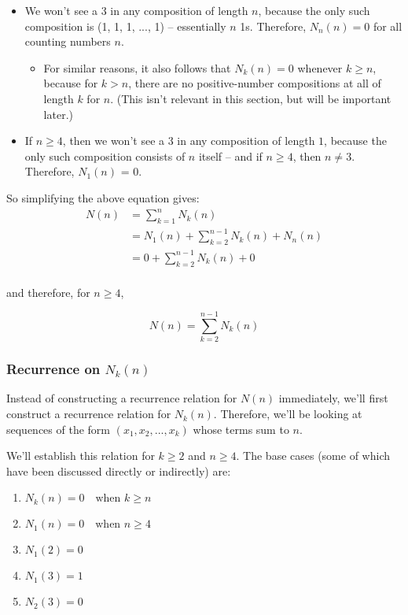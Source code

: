 \begin{itemize}
\item We won't see a 3 in any composition of length $n$, because the only such composition is (1, 1, 1, ..., 1) -- essentially $n$ 1s. Therefore, $N_n(n) = 0$ for all counting numbers $n$.
\begin{itemize}
\item For similar reasons, it also follows that $N_k(n) = 0$ whenever $k \geq n$, because for $k > n$, there are no positive-number compositions at all of length $k$ for $n$. (This isn't relevant in this section, but will be important later.)
\end{itemize}
\item If $n \geq 4$, then we won't see a 3 in any composition of length $1$, because the only such composition consists of $n$ itself -- and if $n \geq 4$, then $n \neq 3$. Therefore, $N_1(n)$ = 0. 
\end{itemize}

So simplifying the above equation gives:
\begin{align*}
N(n) &= \sum_{k=1}^{n} N_k(n) \\
&= N_1(n) + \sum_{k=2}^{n-1} N_k(n) + N_n(n) \\
&= 0 + \sum_{k=2}^{n-1} N_k(n) + 0 \\
\end{align*}

and therefore, for $n \geq 4$,

\begin{equation}
\label{composition-num-3s-n-nk}
N(n) = \sum_{k=2}^{n-1} N_k(n)
\end{equation}

\subsubsection{Recurrence on $N_k(n)$}

Instead of constructing a recurrence relation for $N(n)$ immediately, we'll first construct a recurrence relation for $N_k(n)$. Therefore, we'll be looking at sequences of the form $(x_1, x_2, ..., x_k)$ whose terms sum to $n$.

We'll establish this relation for $k \geq 2$ and $n \geq 4$. The base cases (some of which have been discussed directly or indirectly) are:

\begin{enumerate}
\item $N_k(n) = 0 \quad \text{when } k \geq n$ \label{eqbc-3s-1}
\item $N_1(n) = 0 \quad \text{when } n \geq 4$  \label{eqbc-3s-2}
\item $N_1(2) = 0$  \label{eqbc-3s-3}
\item $N_1(3) = 1$  \label{eqbc-3s-4}
\item $N_2(3) = 0$ \label{hooo}  \label{eqbc-3s-5}
\end{enumerate}


